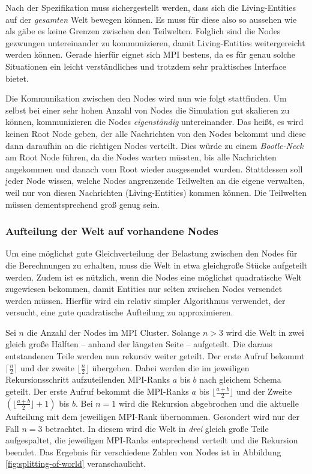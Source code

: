 \documentclass[course=erap]{aspdoc}
\begin{document}
Nach der Spezifikation muss sichergestellt werden, dass sich die Living-Entities auf der \emph{gesamten} Welt bewegen können. Es muss für diese also so aussehen wie als gäbe es keine Grenzen zwischen den Teilwelten. Folglich sind die Nodes gezwungen untereinander zu kommunizieren, damit Living-Entities weitergereicht werden können. Gerade hierfür eignet sich MPI bestens, da es für genau solche Situationen ein leicht verständliches und trotzdem sehr praktisches Interface bietet.

Die Kommunikation zwischen den Nodes wird nun wie folgt stattfinden. Um selbst bei einer sehr hohen Anzahl von Nodes die Simulation gut skalieren zu können, kommunizieren die Nodes \emph{eigenständig} untereinander. Das heißt, es wird keinen Root Node geben, der alle Nachrichten von den Nodes bekommt und diese dann daraufhin an die richtigen Nodes verteilt. Dies würde zu einem \emph{Bootle-Neck} am Root Node führen, da die Nodes warten müssten, bis alle Nachrichten angekommen und danach vom Root wieder ausgesendet wurden. Stattdessen soll jeder Node wissen, welche Nodes angrenzende Teilwelten an die eigene verwalten, weil nur von diesen Nachrichten (Living-Entities) kommen können. Die Teilwelten müssen dementsprechend groß genug sein.


\subsubsection{Aufteilung der Welt auf vorhandene Nodes}
\label{sssec:aufteilung-der-welt}
Um eine möglichst gute Gleichverteilung der Belastung zwischen den Nodes für die Berechnungen zu erhalten, muss die Welt in etwa gleichgroße Stücke aufgeteilt werden. Zudem ist es nützlich, wenn die Nodes eine möglichst quadratische Welt zugewiesen bekommen, damit Entities nur selten zwischen Nodes versendet werden müssen. Hierfür wird ein relativ simpler Algorithmus verwendet, der versucht, eine gute quadratische Aufteilung zu approximieren.

Sei \(n\) die Anzahl der Nodes im MPI Cluster. Solange \(n > 3\) wird die Welt in zwei gleich große Hälften -- anhand der längsten Seite -- aufgeteilt. Die daraus entstandenen Teile werden nun rekursiv weiter geteilt. Der erste Aufruf bekommt \(\lceil\frac{n}{2}\rceil\) und der zweite \(\lfloor\frac{n}{2}\rfloor\) übergeben. Dabei werden die im jeweiligen Rekursionsschritt aufzuteilenden MPI-Ranks \(a\) bis \(b\) nach gleichem Schema geteilt. Der erste Aufruf bekommt die MPI-Ranks \(a\) bis \(\lfloor\frac{a+b}{2}\rfloor\) und der Zweite \((\lfloor\frac{a+b}{2}\rfloor+1)\) bis \(b\). Bei \(n = 1\) wird die Rekursion abgebrochen und die aktuelle Aufteilung mit dem jeweiligen MPI-Rank übernommen. Gesondert wird nur der Fall \(n = 3\) betrachtet. In diesem wird die Welt in \emph{drei} gleich große Teile aufgespaltet, die jeweiligen MPI-Ranks entsprechend verteilt und die Rekursion beendet. Das Ergebnis für verschiedene Zahlen von Nodes ist in Abbildung \ref{fig:splitting-of-world} veranschaulicht.
\end{document}
